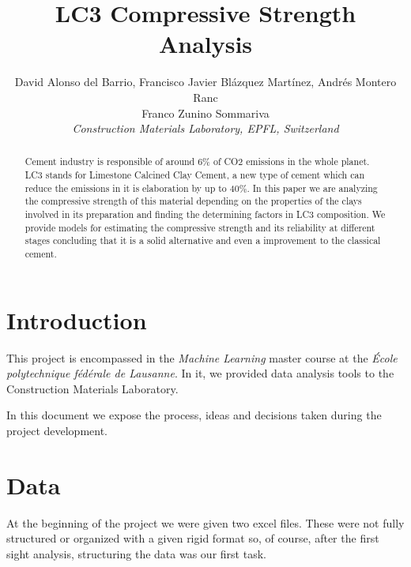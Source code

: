 \documentclass[10pt,conference,compsocconf]{IEEEtran}
\begin{document}
\title{LC3 Compressive Strength Analysis}
\author{
  David Alonso del Barrio, Francisco Javier Blázquez Martínez, Andrés Montero Ranc\\
  Franco Zunino Sommariva \\
  \textit{Construction Materials Laboratory, EPFL, Switzerland}
}

\maketitle

\begin{abstract}
Cement industry is responsible of around 6\% of CO2 emissions in the whole planet. LC3 stands for Limestone Calcined Clay Cement, a new type of cement which can reduce the emissions in it is elaboration by up to 40\%. In this paper we are analyzing the compressive strength of this material depending on the properties of the clays involved in its preparation and finding the determining factors in LC3 composition. We provide models for estimating the compressive strength and its reliability at different stages concluding that it is a solid alternative and even a improvement to the classical cement. %


\end{abstract}

\section{Introduction}

This project is encompassed in the \textit{Machine Learning} master course at the \textit{École polytechnique fédérale de Lausanne}. In it, we provided data analysis tools to the Construction Materials Laboratory.

In this document we expose the process, ideas and decisions taken during the project development.


\section{Data}

At the beginning of the project we were given two excel files. These were not fully structured or organized with a given rigid format so, of course, after the first sight analysis, structuring the data was our first task.
\end{document}
